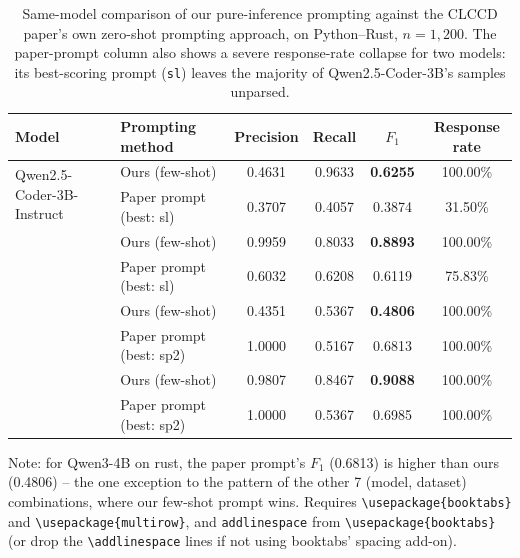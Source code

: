 \begin{table}[t]
\centering
\caption{Same-model comparison of our pure-inference prompting against the
CLCCD paper's own zero-shot prompting approach, on Python--Rust,
$n=1{,}200$. The paper-prompt column also shows a severe response-rate
collapse for two models: its best-scoring prompt (\texttt{sl}) leaves the
majority of Qwen2.5-Coder-3B's samples unparsed.}
\label{tab:results-rust-promptmethod}
\begin{tabular}{llcccc}
\toprule
Model & Prompting method & Precision & Recall & $F_1$ & Response rate \\
\midrule
\multirow{2}{*}{Qwen2.5-Coder-3B-Instruct}
 & Ours (few-shot)            & 0.4631 & 0.9633 & \textbf{0.6255} & 100.00\% \\
 & Paper prompt (best: sl)    & 0.3707 & 0.4057 & 0.3874 & 31.50\%  \\
\addlinespace
\multirow{2}{*}{Qwen2.5-Coder-7B-Instruct}
 & Ours (few-shot)            & 0.9959 & 0.8033 & \textbf{0.8893} & 100.00\% \\
 & Paper prompt (best: sl)    & 0.6032 & 0.6208 & 0.6119 & 75.83\%  \\
\addlinespace
\multirow{2}{*}{Qwen3-4B}
 & Ours (few-shot)            & 0.4351 & 0.5367 & \textbf{0.4806} & 100.00\% \\
 & Paper prompt (best: sp2)   & 1.0000 & 0.5167 & 0.6813 & 100.00\% \\
\addlinespace
\multirow{2}{*}{Qwen3-8B}
 & Ours (few-shot)            & 0.9807 & 0.8467 & \textbf{0.9088} & 100.00\% \\
 & Paper prompt (best: sp2)   & 1.0000 & 0.5367 & 0.6985 & 100.00\% \\
\bottomrule
\end{tabular}

\vspace{4pt}
{\footnotesize
Note: for Qwen3-4B on rust, the paper prompt's $F_1$ (0.6813) is higher
than ours (0.4806) -- the one exception to the pattern of the other 7
(model, dataset) combinations, where our few-shot prompt wins. Requires
\texttt{\textbackslash usepackage\{booktabs\}} and
\texttt{\textbackslash usepackage\{multirow\}}, and \texttt{addlinespace}
from \texttt{\textbackslash usepackage\{booktabs\}} (or drop the
\texttt{\textbackslash addlinespace} lines if not using booktabs' spacing
add-on).}
\end{table}
